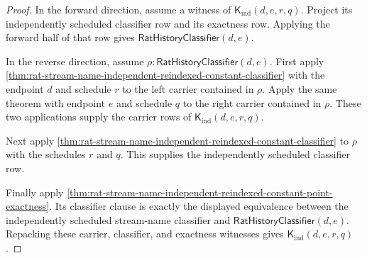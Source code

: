 \begin{proof}
In the forward direction, assume a witness of
$\mathsf{K}_{\mathrm{ind}}(d,e,r,q)$. Project its independently scheduled
classifier row and its exactness row. Applying the forward half of that row
gives $\mathsf{RatHistoryClassifier}(d,e)$.

In the reverse direction, assume
$\rho:\mathsf{RatHistoryClassifier}(d,e)$. First apply
\autoref{thm:rat-stream-name-independent-reindexed-constant-classifier} with
the endpoint $d$ and schedule $r$ to the left carrier contained in $\rho$.
Apply the same theorem with endpoint $e$ and schedule $q$ to the right carrier
contained in $\rho$. These two applications supply the carrier rows of
$\mathsf{K}_{\mathrm{ind}}(d,e,r,q)$.

Next apply
\autoref{thm:rat-stream-name-independent-reindexed-constant-classifier} to
$\rho$ with the schedules $r$ and $q$. This supplies the independently
scheduled classifier row.

Finally apply
\autoref{thm:rat-stream-name-independent-reindexed-constant-point-exactness}.
Its classifier clause is exactly the displayed equivalence between the
independently scheduled stream-name classifier and
$\mathsf{RatHistoryClassifier}(d,e)$. Repacking these carrier, classifier, and
exactness witnesses gives $\mathsf{K}_{\mathrm{ind}}(d,e,r,q)$.
\end{proof}

